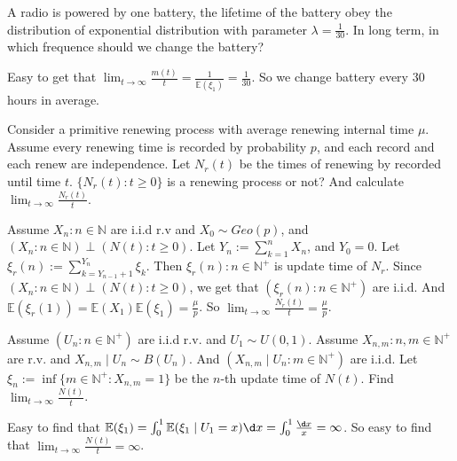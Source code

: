 \documentclass[../main]{subfiles}
\begin{document}
\begin{problem}\label{pro:1}
  A radio is powered by one battery,
  the lifetime of the battery obey the distribution of exponential distribution
  with parameter \(\lambda = \frac{1}{30}\). In long term, in which frequence should we change the battery?
\end{problem}
\begin{solution}
  Easy to get that \(\lim_{t \to \infty}\frac{m(t)}{t}=\frac{1}{\mathbb{E}(\xi_1)}=\frac{1}{30}\).
  So we change battery every \(30\) hours in average.
\end{solution}

\begin{problem}\label{pro:2}
  Consider a primitive renewing process with average renewing internal time \(\mu\). Assume every renewing time
  is recorded by probability \(p\), and each record and each renew are independence. Let \(N_r(t)\) be the
  times of renewing by recorded until time \(t\). \(\{N_r(t): t \geq 0\}\) is a renewing process or not?
  And calculate \(\lim_{t \to \infty}\frac{N_r(t)}{t}\).
\end{problem}
\begin{solution}
  Assume \(X_n:n \in \mathbb{N}\) are i.i.d r.v and \(X_0 \sim Geo(p)\), and \((X_n:n \in \mathbb{N})\perp (N(t):t \geq 0)\).
  Let \(Y_n:=\sum_{k=1}^{n} X_n\), and \(Y_0=0\).
  Let \(\xi_r(n):=\sum_{k=Y_{n-1}+1}^{Y_{n}} \xi_k\).
  Then \(\xi_r(n):n \in \mathbb{N}^+\) is update time of \(N_r\).
  Since \((X_n:n \in \mathbb{N})\perp (N(t):t \geq 0)\), we get that \((\xi_r(n):n \in \mathbb{N}^+)\) are i.i.d.
  And \(\mathbb{E}(\xi_r(1))=\mathbb{E}(X_1)\mathbb{E}(\xi_1)=\frac{\mu}{p}\).
  So \(\lim_{t \to \infty}\frac{N_r(t)}{t}=\frac{\mu}{p}\).
\end{solution}
\begin{problem}\label{pro:3}
  Assume \((U_n:n \in \mathbb{N}^+)\) are i.i.d r.v. and \(U_1 \sim U(0,1)\).
  Assume \(X_{n,m}:n,m \in \mathbb{N}^+\) are r.v. and \(X_{n,m} \mid U_n \sim B(U_n)\).
  And \((X_{n,m} \mid U_n:m \in \mathbb{N}^+)\) are i.i.d.
  Let \(\xi_n:=\inf \{m \in \mathbb{N}^+:X_{n,m}=1\}\) be the \(n\)-th update time of \(N(t)\).
  Find \(\lim_{t \to \infty}\frac{N(t)}{t}\).
\end{problem}
\begin{solution}
  Easy to find that \(\mathbb{E}(\xi_1)=\int_{0}^{1} \mathbb{E}(\xi_1 \mid U_1=x) \d x=\int_{0}^{1} \frac{\d x}{x}=\infty\).
  So easy to find that \(\lim_{t \to \infty}\frac{N(t)}{t}=\infty\).
\end{solution}
\end{document}
